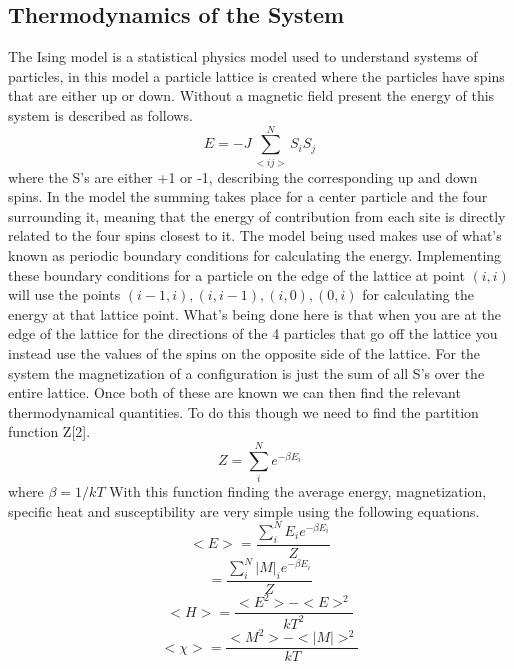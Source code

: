 \documentclass[12pt,righttag]{article}
\begin{document}
\subsection{Thermodynamics of the System}
The Ising model is a statistical physics model used to understand systems of particles, in this model a particle lattice is created where the particles have spins that are either up or down. Without a magnetic field present the energy of this system is described as follows.
\[E=-J\sum_{<ij>}^{N}S_iS_j\] 
where the S's are either +1 or -1, describing the corresponding up and down spins. In the model the summing takes place for a center particle and the four surrounding it, meaning that the energy of contribution from each site is directly related to the four spins closest to it. The model being used makes use of what's known as periodic boundary conditions for calculating the energy. Implementing these boundary conditions for a particle on the edge of the lattice at point $(i,i)$ will use the points $(i-1,i),(i,i-1),(i,0),(0,i)$ for calculating the energy at that lattice point. What's being done here is that when you are at the edge of the lattice for the directions of the 4 particles that go off the lattice you instead use the values of the spins on the opposite side of the lattice. For the system the magnetization of a configuration is just the sum of all S's over the entire lattice. Once both of these are known we can then find the relevant thermodynamical quantities. To do this though we need to find the partition function Z[2].
\[Z=\sum_{i}^{N}e^{-\beta E_i}\]
where $\beta=1/kT$
With this function finding the average energy, magnetization, specific heat  and susceptibility are very simple using the following equations.
\[<E>=\frac{\sum_{i}^{N}E_ie^{-\beta E_i}}{Z}\]
\[<|M|>=\frac{\sum_{i}^{N}|M|_ie^{-\beta E_i}}{Z}\]
\[<H>=\frac{<E^2>-<E>^2}{kT^2}\]
\[<\chi>=\frac{<M^2>-<|M|>^2}{kT}\]
\end{document}

